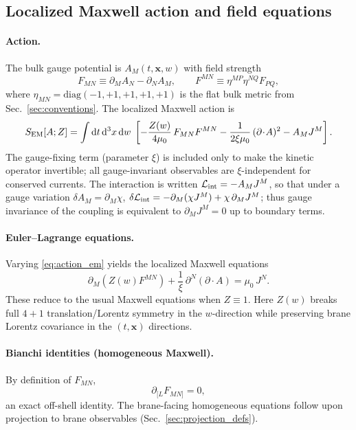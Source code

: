 \documentclass[11pt]{article}
\newcommand{\x}{\mathbf{x}}     %
\newcommand{\A}{A}              %
\newcommand{\F}{F}              %
\newcommand{\J}{J}              %
\newcommand{\Z}{Z}              %
\newcommand{\muzero}{\mu_0}
\begin{document}
\subsection{Localized Maxwell action and field equations}
\label{sec:localized_maxwell}

\paragraph{Action.}
The bulk gauge potential is \(\A_M(t,\x,w)\) with field strength
\begin{equation}
  \F_{MN} \equiv \partial_M \A_N - \partial_N \A_M,
  \qquad
  \F^{MN} \equiv \eta^{MP}\eta^{NQ}\F_{PQ},
\end{equation}
where \(\eta_{MN}=\mathrm{diag}(-1,+1,+1,+1,+1)\) is the flat bulk metric from
Sec.~\ref{sec:conventions}. The localized Maxwell action is
\begin{equation}
S_{\rm EM}[\A;\Z]
= \int \dd t\,\dd^3x\,\dd w\;
\left[
-\frac{\Z(w)}{4\muzero}\,\F_{MN}\F^{MN}
-\frac{1}{2\xi\muzero}\,(\partial\!\cdot\!\A)^2
- \A_M \J^M
\right].
\label{eq:action_em}
\end{equation}
The gauge-fixing term (parameter \(\xi\)) is included only to make the kinetic
operator invertible; all gauge-invariant observables are \(\xi\)-independent for
conserved currents. The interaction is written \(\mathcal{L}_{\rm int}=-\A_M\J^M\),
so that under a gauge variation \(\delta \A_M=\partial_M\chi\),
\(\delta\mathcal{L}_{\rm int}=-\partial_M(\chi\J^M)+\chi\,\partial_M\J^M\); thus
gauge invariance of the coupling is equivalent to \(\partial_M\J^M=0\) up to
boundary terms.

\paragraph{Euler--Lagrange equations.}
Varying \eqref{eq:action_em} yields the localized Maxwell equations
\begin{equation}
\partial_M\!\left(\Z(w)\F^{MN}\right)
+\frac{1}{\xi}\,\partial^N(\partial\!\cdot\!\A)
=\muzero\,\J^N.
\label{eq:maxwell_localized}
\end{equation}
These reduce to the usual Maxwell equations when \(\Z\equiv 1\). Here \(\Z(w)\)
breaks full \(4+1\) translation/Lorentz symmetry in the \(w\)-direction while
preserving brane Lorentz covariance in the \((t,\x)\) directions.

\paragraph{Bianchi identities (homogeneous Maxwell).}
By definition of \(\F_{MN}\),
\begin{equation}
\partial_{[L}\F_{MN]}=0,
\label{eq:bianchi}
\end{equation}
an exact off-shell identity. The brane-facing homogeneous equations follow upon
projection to brane observables (Sec.~\ref{sec:projection_defs}).
\end{document}
